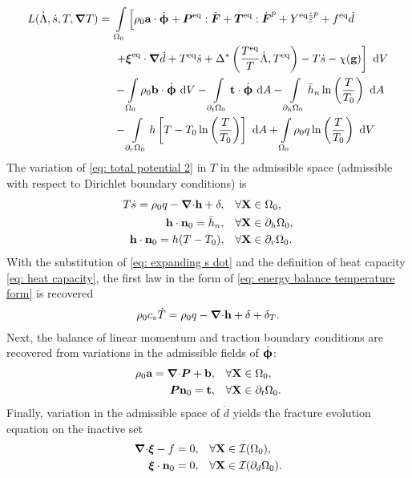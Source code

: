 \begin{equation}
\begin{aligned}
  L(\dot{\Lambda}, \dot{s}, T, \grad T) =&\ \int\limits_{\body_0} \left[ \rho_0\bta\cdot\defrate + \bfP^\text{eq}:\dot{\defgrad} + \bfT^\text{eq}:\dot{\defgrad}^p + Y^\text{eq}\epdot + f^\text{eq}\dot{d} \right.\\
  &\ \left. + \bs{\xi}^\text{eq}\cdot\grad\dot{d} + T^\text{eq}\dot{s} + \Delta^*\left( \dfrac{T^\text{eq}}{T}\dot{\Lambda}, T^\text{eq} \right) - T\dot{s} - \chi(\btg) \right] \diff{V} \\
  &\ - \int\limits_{\body_0} \rho_0 \btb \cdot \defrate \diff{V} - \int\limits_{\partial_t\body_0} \btt \cdot \defrate \diff{A} - \int\limits_{\partial_h\body_0} \bar{h}_n\ln\left( \dfrac{T}{T_0} \right) \diff{A} \\
  &\ - \int\limits_{\partial_r\body_0} h\left[ T - T_0 \ln\left( \dfrac{T}{T_0} \right) \right] \diff{A} + \int\limits_{\body_0} \rho_0 q \ln\left( \dfrac{T}{T_0} \right) \diff{V} 
\end{aligned}\label{eq: total potential 2}
\end{equation}
The variation of \eqref{eq: total potential 2} in $T$ in the admissible space (admissible with respect to Dirichlet boundary conditions) is
\begin{subequations}
\begin{align}
    T\dot{s} = \rho_0 q - {\boldsymbol{\nabla} \cdot} \textbf{h} + \delta, &\quad \forall \textbf{X} \in \Omega_0, \\
    \textbf{h} \cdot \textbf{n}_0 = \bar{h}_n, &\quad \forall \textbf{X} \in \partial_h\Omega_0, \\
    \textbf{h} \cdot \textbf{n}_0 = h(T - T_0), &\quad \forall \textbf{X} \in \partial_r\Omega_0.
\end{align}
\end{subequations}
With the substitution of \eqref{eq: expanding s dot} and the definition of heat capacity \eqref{eq: heat capacity}, the first law in the form of \eqref{eq: energy balance temperature form} is recovered
\begin{align}
    \rho_0 c_v \dot{T} = \rho_0 q - {\boldsymbol{\nabla} \cdot} \textbf{h} + \delta + \delta_T.
\end{align}
Next, the balance of linear momentum and traction boundary conditions are recovered from variations in the admissible fields of $\dot{\boldsymbol{\upphi}}$:
\begin{subequations}
\begin{align}
  \rho_0\textbf{a} = {\boldsymbol{\nabla} \cdot}\boldsymbol{P} + \textbf{b}, &\quad \forall \textbf{X} \in \Omega_0, \\
  \boldsymbol{P}\textbf{n}_0 = \textbf{t}, &\quad \forall \textbf{X} \in \partial_t\Omega_0.
\end{align}
\end{subequations}
Finally, variation in the admissible space of $\dot{d}$ yields the fracture evolution equation on the inactive set
\begin{align}
  {\boldsymbol{\nabla}\cdot} \boldsymbol{\xi} - f = 0, &\quad \forall \textbf{X} \in \mathcal{I}(\Omega_0), \\
  \boldsymbol{\xi}\cdot\textbf{n}_0 = 0, &\quad \forall \textbf{X} \in \mathcal{I}(\partial_d\Omega_0).
\end{align}
